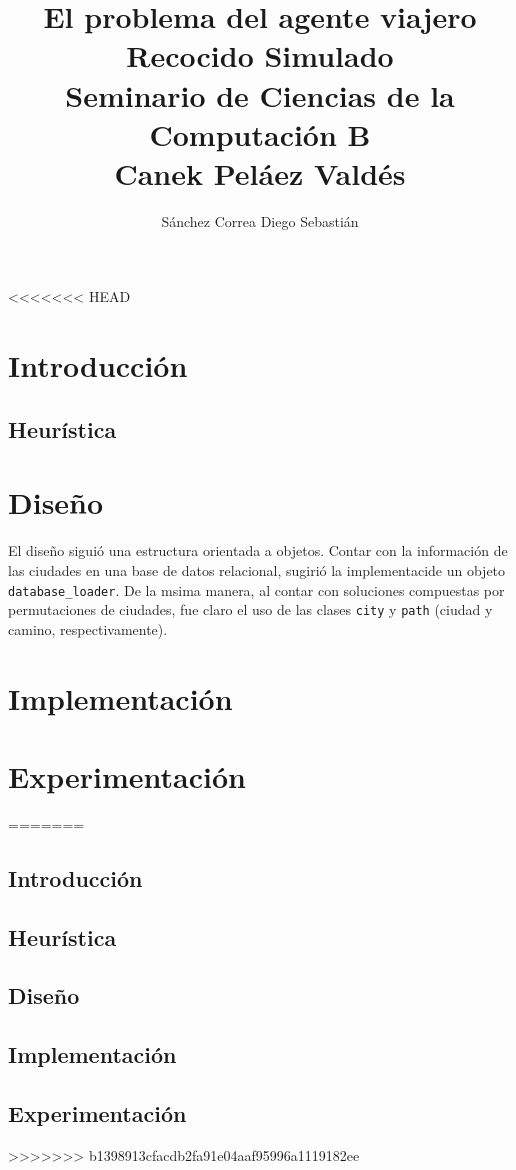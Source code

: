 \documentclass[a4paper]{report}
\title {\textbf {\Large{El problema del agente viajero}}\protect\\
  \large{\textbf{Recocido Simulado}}\protect\\ \vspace{0.4cm}
  \normalsize{\textbf{Seminario de Ciencias de la Computaci\'on B}} \protect\\ \vspace{0.2cm}
  \normalsize{Canek Pel\'aez Vald\'es}}
\date{}
\author{\normalsize Sánchez Correa Diego Sebastián}
\begin{document}
\allowdisplaybreaks
\maketitle
<<<<<<< HEAD
\tableofcontents

\chapter{Introducci\'on}
\section{Heur\'istica}
\chapter{Dise\~no}

El dise\~no sigui\'o una estructura orientada a objetos. Contar con la informaci\'on
de las ciudades en una base de datos relacional, sugiri\'o la implementaci\on de
un objeto \texttt{database_loader}. De la msima manera, al contar con soluciones
compuestas por permutaciones de ciudades, fue claro el uso de las clases \texttt{city}
y \texttt{path} (ciudad y camino, respectivamente).

\chapter{Implementaci\'on}
\chapter{Experimentaci\'on}
=======

\section{Introducci\'on}

\section{Heur\'istica}
\section{Dise\~no}
\section{Implementaci\'on}
\section{Experimentaci\'on}
>>>>>>> b1398913cfacdb2fa91e04aaf95996a1119182ee
\end{document}
